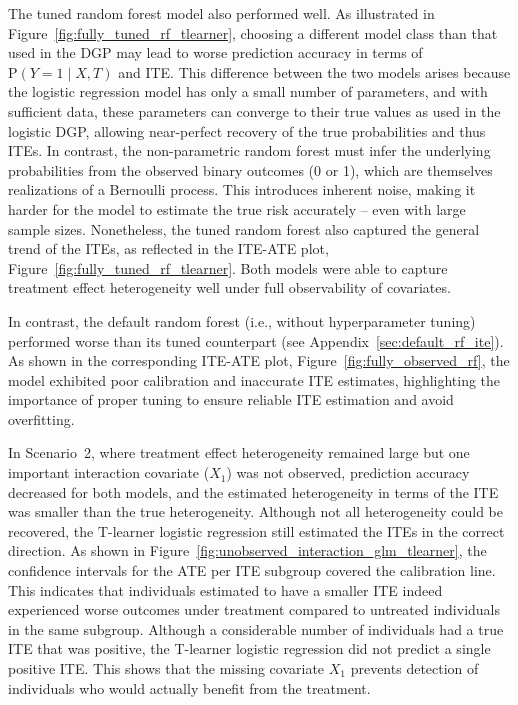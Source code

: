 The tuned random forest model also performed well. As illustrated in Figure~\ref{fig:fully_tuned_rf_tlearner}, choosing a different model class than that used in the DGP may lead to worse prediction accuracy in terms of $\text{P}(Y = 1 \mid X, T)$ and ITE. This difference between the two models arises because the logistic regression model has only a small number of parameters, and with sufficient data, these parameters can converge to their true values as used in the logistic DGP, allowing near-perfect recovery of the true probabilities and thus ITEs. In contrast, the non-parametric random forest must infer the underlying probabilities from the observed binary outcomes (0 or 1), which are themselves realizations of a Bernoulli process. This introduces inherent noise, making it harder for the model to estimate the true risk accurately -- even with large sample sizes. Nonetheless, the tuned random forest also captured the general trend of the ITEs, as reflected in the ITE-ATE plot, Figure~\ref{fig:fully_tuned_rf_tlearner}. Both models were able to capture treatment effect heterogeneity well under full observability of covariates.



In contrast, the default random forest (i.e., without hyperparameter tuning) performed worse than its tuned counterpart (see Appendix~\ref{sec:default_rf_ite}). As shown in the corresponding ITE-ATE plot, Figure~\ref{fig:fully_observed_rf}, the model exhibited poor calibration and inaccurate ITE estimates, highlighting the importance of proper tuning to ensure reliable ITE estimation and avoid overfitting.


\medskip


\medskip


In Scenario~2, where treatment effect heterogeneity remained large but one important interaction covariate ($X_1$) was not observed, prediction accuracy decreased for both models, and the estimated heterogeneity in terms of the ITE was smaller than the true heterogeneity. Although not all heterogeneity could be recovered, the T-learner logistic regression still estimated the ITEs in the correct direction. As shown in Figure~\ref{fig:unobserved_interaction_glm_tlearner}, the confidence intervals for the ATE per ITE subgroup covered the calibration line. This indicates that individuals estimated to have a smaller ITE indeed experienced worse outcomes under treatment compared to untreated individuals in the same subgroup. Although a considerable number of individuals had a true ITE that was positive, the T-learner logistic regression did not predict a single positive ITE. This shows that the missing covariate $X_1$ prevents detection of individuals who would actually benefit from the treatment. 

